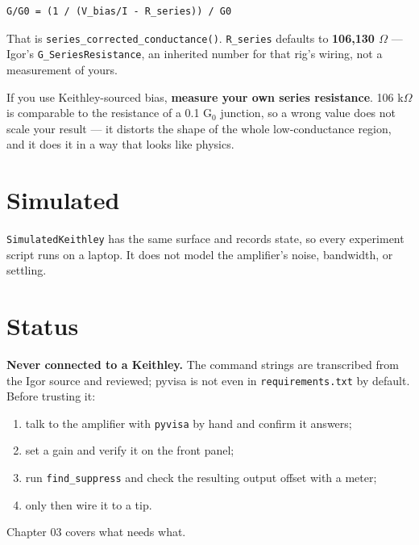 \begin{lstlisting}[style=out]
G/G0 = (1 / (V_bias/I - R_series)) / G0
\end{lstlisting}

That is \texttt{series\_\discretionary{}{}{}corrected\_\discretionary{}{}{}conductance()}. \texttt{R\_\discretionary{}{}{}series} defaults to \textbf{106,130 $\Omega$} --- Igor's \texttt{G\_\discretionary{}{}{}Series\discretionary{}{}{}Resistance}, an inherited number for that rig's wiring, not a measurement of yours.

\begin{keybox}
If you use Keithley-sourced bias, \textbf{measure your own series resistance}. 106 k$\Omega$ is comparable to the resistance of a 0.1 G$_0$ junction, so a wrong value does not scale your result --- it distorts the shape of the whole low-conductance region, and it does it in a way that looks like physics.
\end{keybox}

\section{Simulated}

\texttt{Simulated\discretionary{}{}{}Keithley} has the same surface and records state, so every experiment script runs on a laptop. It does not model the amplifier's noise, bandwidth, or settling.

\section{Status}

\textbf{Never connected to a Keithley.} The command strings are transcribed from the Igor source and reviewed; pyvisa is not even in \texttt{requirements.\discretionary{}{}{}txt} by default. Before trusting it:

\begin{enumerate}[leftmargin=*]
\item talk to the amplifier with \texttt{pyvisa} by hand and confirm it answers;
\item set a gain and verify it on the front panel;
\item run \texttt{find\_\discretionary{}{}{}suppress} and check the resulting output offset with a meter;
\item only then wire it to a tip.
\end{enumerate}

Chapter 03 covers what needs what.

